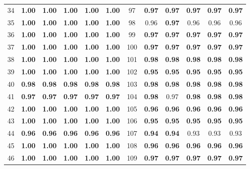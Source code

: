 \documentclass{article}
\begin{document}
{\begin{longtable}{cccccc@{\qquad}cccccc}
34 & \textbf{1.00} & \textbf{1.00} & \textbf{1.00} & \textbf{1.00} & \textbf{1.00} & 97 & \textbf{0.97} & \textbf{0.97} & \textbf{0.97} & \textbf{0.97} & \textbf{0.97} \\
35 & \textbf{1.00} & \textbf{1.00} & \textbf{1.00} & \textbf{1.00} & \textbf{1.00} & 98 & 0.96 & \textbf{0.97} & 0.96 & 0.96 & 0.96 \\
36 & \textbf{1.00} & \textbf{1.00} & \textbf{1.00} & \textbf{1.00} & \textbf{1.00} & 99 & \textbf{0.97} & \textbf{0.97} & \textbf{0.97} & \textbf{0.97} & \textbf{0.97} \\
37 & \textbf{1.00} & \textbf{1.00} & \textbf{1.00} & \textbf{1.00} & \textbf{1.00} & 100 & \textbf{0.97} & \textbf{0.97} & \textbf{0.97} & \textbf{0.97} & \textbf{0.97} \\
38 & \textbf{1.00} & \textbf{1.00} & \textbf{1.00} & \textbf{1.00} & \textbf{1.00} & 101 & \textbf{0.98} & \textbf{0.98} & \textbf{0.98} & \textbf{0.98} & \textbf{0.98} \\
39 & \textbf{1.00} & \textbf{1.00} & \textbf{1.00} & \textbf{1.00} & \textbf{1.00} & 102 & \textbf{0.95} & \textbf{0.95} & \textbf{0.95} & \textbf{0.95} & \textbf{0.95} \\
40 & \textbf{0.98} & \textbf{0.98} & \textbf{0.98} & \textbf{0.98} & \textbf{0.98} & 103 & \textbf{0.98} & \textbf{0.98} & \textbf{0.98} & \textbf{0.98} & \textbf{0.98} \\
41 & \textbf{0.97} & \textbf{0.97} & \textbf{0.97} & \textbf{0.97} & \textbf{0.97} & 104 & \textbf{0.98} & 0.97 & \textbf{0.98} & \textbf{0.98} & \textbf{0.98} \\
42 & \textbf{1.00} & \textbf{1.00} & \textbf{1.00} & \textbf{1.00} & \textbf{1.00} & 105 & \textbf{0.96} & \textbf{0.96} & \textbf{0.96} & \textbf{0.96} & \textbf{0.96} \\
43 & \textbf{1.00} & \textbf{1.00} & \textbf{1.00} & \textbf{1.00} & \textbf{1.00} & 106 & \textbf{0.95} & \textbf{0.95} & \textbf{0.95} & \textbf{0.95} & \textbf{0.95} \\
44 & \textbf{0.96} & \textbf{0.96} & \textbf{0.96} & \textbf{0.96} & \textbf{0.96} & 107 & \textbf{0.94} & \textbf{0.94} & 0.93 & 0.93 & 0.93 \\
45 & \textbf{1.00} & \textbf{1.00} & \textbf{1.00} & \textbf{1.00} & \textbf{1.00} & 108 & \textbf{0.96} & \textbf{0.96} & \textbf{0.96} & \textbf{0.96} & \textbf{0.96} \\
46 & \textbf{1.00} & \textbf{1.00} & \textbf{1.00} & \textbf{1.00} & \textbf{1.00} & 109 & \textbf{0.97} & \textbf{0.97} & \textbf{0.97} & \textbf{0.97} & \textbf{0.97} \\

\end{longtable}}
\end{document}
